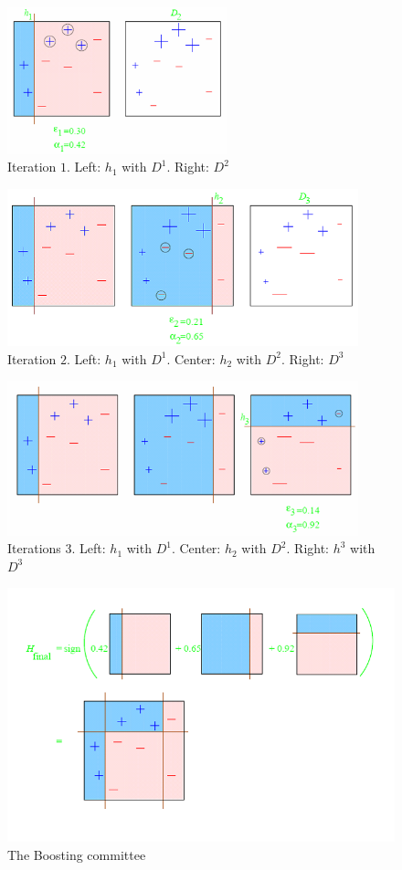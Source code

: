 \documentclass[11pt]{article}
\begin{document}
\begin{figure}[H]
  \centering
  \includegraphics[width=2.5in]{boosting_toy1.png}
  \caption{Iteration $1$. Left: $h_1$ with $D^1$. Right: $D^2$ }

\end{figure}
\begin{figure}[H]
  \centering
  \includegraphics[width=4in]{boosting_toy2.png}
  \caption{Iteration $2$.  Left: $h_1$ with $D^1$. Center:
  $h_2$ with $D^2$. Right: $D^3$}
\end{figure}
\begin{figure}[H]
  \centering
  \includegraphics[width=4in]{boosting_toy3.png}
  \caption{Iterations $3$. Left: $h_1$ with $D^1$. 
  Center: $h_2$ with $D^2$. Right: $h^3$ with $D^3$}
\end{figure}
\begin{figure}[H]
  \centering
  \includegraphics[width=5in]{boosting_final.png}
  \caption{The Boosting committee}
\end{figure}
\end{document}
